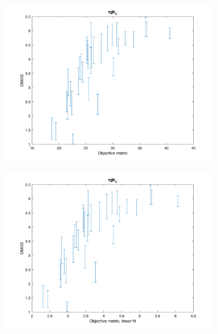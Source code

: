 \documentclass{article}
\begin{document}
\begin{figure}
  
    \centering
   \begin{subfigure}[b]{0.65\textwidth}
   \includegraphics[width=\textwidth]{Figures/task3/rgb1.png}
   \end{subfigure}
   
   \begin{subfigure}[b]{0.65\textwidth}
   \includegraphics[width=\textwidth]{Figures/task3/rgb1_linear.png}
   \end{subfigure}
   

\end{figure}
\end{document}
